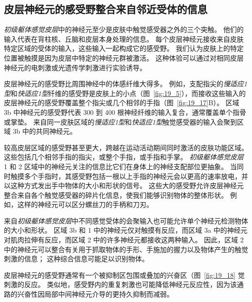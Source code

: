 \subsection{皮层神经元的感受野整合来自邻近受体的信息}

\textit{初级躯体感觉皮层}中的神经元至少是皮肤中触觉感受器之外的三个突触。
他们的输入代表在背柱核、丘脑和皮层本身处理的信息。 
每个皮层神经元接收来自皮肤特定区域的受体的输入，这些输入一起构成它的感受野。
我们认为皮肤上的特定位置被触摸是因为皮层中特定的神经元群被激活。
这种体验可以通过对相同皮层神经元的电刺激或光遗传学刺激进行实验诱导。


皮层神经元的感受野比周围神经中的体感纤维大得多。
例如，支配指尖的\textit{慢适应1型}和\textit{快适应1型}纤维的感受野是皮肤上的小点（图~\ref{fig:19_5}），而接收这些输入的皮层神经元的感受野覆盖整个指尖或几个相邻的手指（图~\ref{fig:19_17}B）。
区域 3b 中神经元的感受野代表 300 到 400 根神经纤维的输入复合，通常覆盖单个指骨或掌垫。
来自同一皮肤区域的\textit{慢适应1型}和\textit{快适应1型}触觉感受器的输入会聚到区域 3b 中的共同神经元。


较高皮层区域的感受野甚至更大，跨越在运动活动期间同时激活的皮肤功能区域。
这些包括几个相邻手指的指尖，或整个手指，或手指和手掌。
\textit{初级躯体感觉皮层} 1 和 2 区域中的神经元关注的信息比它们在身体上的神经支配部位更抽象。
当同时触摸多个手指时，其感受野包括一根以上手指的神经元会以更高的速率放电，并以这种方式发出手中物体的大小和形状的信号。
这些大的感受野允许皮层神经元整合来自各个触觉感受器的碎片化信息，使我们能够识别物体的整体形状。
例如，这样的神经元可以区分螺丝刀的手柄和刀刃。


来自\textit{初级躯体感觉皮层}中不同感觉受体的会聚输入也可能允许单个神经元检测物体的大小和形状。
区域 3b 和 1 中的神经元仅对触摸有反应，而区域 3a 中的神经元对肌肉拉伸有反应，而区域 2 中的许多神经元都接收这两种输入。
因此，区域 2 中的神经元可以整合有关用于抓取物体的手形、手施加的握力以及物体产生的触觉刺激的信息；
这种综合信息可能足以识别物体。


皮层神经元的感受野通常有一个被抑制区包围或叠加的兴奋区（图~\ref{fig:19_18} 觉刺激的反应。
类似地，感受野内的重复刺激也可能降低神经元反应性，因为该通路的兴奋性因局部中间神经元介导的更持久抑制而减弱。


